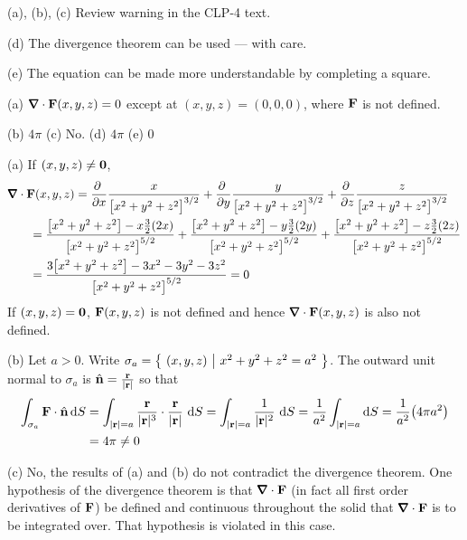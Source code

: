 \begin{hint} 
(a), (b), (c) Review warning  in the CLP-4 text.

(d) The divergence theorem can be used --- with care.

(e) The equation can be made more understandable by completing a square.
\end{hint}

\begin{answer} 
(a) $\vnabla \cdot \vF(x,y,z)=0$ except at $(x,y,z)=(0,0,0)$, where
$\mathbf{F}$ is not defined.

(b) $4\pi$\qquad
(c) No. \qquad
(d) $4\pi$\qquad
(e) $0$

\end{answer}

\begin{solution} (a) 
If $(x,y,z)\ne\mathbf{0}$,
\begin{align*}
&\vnabla\cdot\vF(x,y,z)
=\pdiff{}{x}\frac{x}{{\big[x^2+y^2+z^2\big]}^{3/2}}
+\pdiff{}{y}\frac{y}{{\big[x^2+y^2+z^2\big]}^{3/2}}
+\pdiff{}{z}\frac{z}{{\big[x^2+y^2+z^2\big]}^{3/2}}
\\
&\hskip0.25in
=\frac{\big[x^2+y^2+z^2\big]-x\frac{3}{2}(2x)}{{\big[x^2+y^2+z^2\big]}^{5/2}}
+\frac{\big[x^2+y^2+z^2\big]-y\frac{3}{2}(2y)}{{\big[x^2+y^2+z^2\big]}^{5/2}}
+\frac{\big[x^2+y^2+z^2\big]-z\frac{3}{2}(2z)}{{\big[x^2+y^2+z^2\big]}^{5/2}}
\\
&\hskip0.25in
=\frac{3\big[x^2+y^2+z^2\big]-3x^2-3y^2-3z^2}{{\big[x^2+y^2+z^2\big]}^{5/2}}
=0
\end{align*}
If $(x,y,z)=\mathbf{0}$, $\mathbf{F}(x,y,z)$ is not defined 
and hence $\vnabla\cdot\vF(x,y,z)$ is also not defined.

\noindent (b)
Let $a>0$. Write
$\sigma_a = \big\{ \ (x,y,z)\ \big|\ x^2+y^2+z^2 = a^2\ \big\}$. The outward unit normal 
to $\sigma_a$ is $\hat{\mathbf{n}} = \frac{\mathbf{r}}{|\mathbf{r}|}$ so that
\begin{align*}
\int_{\sigma_a}\vF\cdot\hn\, \dee{S}
&=\int_{|\vr|=a}  \frac{\vr}{|\vr|^3}\cdot \frac{\vr}{|\vr|}\ \dee{S} 
=\int_{|\vr|=a}  \frac{1}{|\vr|^2}\ \dee{S}
=\frac{1}{a^2}\int_{|\vr|=a}\dee{S} 
=\frac{1}{a^2}\big(4\pi a^2\big) \\
&=4\pi\ne 0
\end{align*}

\noindent (c)
No, the results of (a) and (b) do not contradict the divergence theorem.
One hypothesis of the divergence theorem is that $\vnabla\cdot\vF$
(in fact all first order derivatives of $\mathbf{F}$) be defined and continuous
throughout the solid that $\vnabla\cdot\vF$ is to be integrated over.
That hypothesis is violated in this case.


\end{solution}
